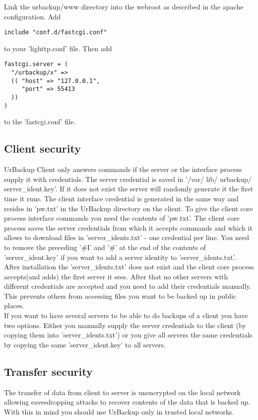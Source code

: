 \documentclass[a4paper,10pt]{article} \usepackage[breaklinks=true]{hyperref}
\begin{document}
Link the urbackup/www directory into the webroot as described in the apache configuration.
Add
\begin{verbatim}
include "conf.d/fastcgi.conf"
\end{verbatim}
to your 'lighttp.conf' file. Then add 
\begin{verbatim}
fastcgi.server = (
  "/urbackup/x" =>
  (( "host" => "127.0.0.1",
     "port" => 55413
  ))
)
\end{verbatim}
to the 'fastcgi.conf' file.

\subsection{Client security}

UrBackup Client only answers commands if the server or the interface process supply it with credentials. The server credential is saved in '/var/ lib/ urbackup/ server\_ident.key'. If it does not exist the server will randomly generate it the first time it runs. The client interface credential is generated in the same way and resides in 'pw.txt' in the UrBackup directory on the client. To give the client core process interface commands you need the contents of 'pw.txt'. The client core process saves the server credentials from which it accepts commands and which it allows to download files in 'server\_idents.txt' - one credential per line. You need to remove the preceding '\#I' and '\#' at the end of the contents of 'server\_ident.key' if you want to add a server identity to 'server\_idents.txt'. After installation the 'server\_idents.txt' does not exist and the client core process accepts(and adds) the first server it sees. After that no other servers with different credentials are accepted and you need to add their credentials manually. This prevents others from accessing files you want to be backed up in public places.\\
If you want to have several servers to be able to do backups of a client you have two options. Either you manually supply the server credentials to the client (by copying them into 'server\_idents.txt') or you give all servers the same credentials by copying the same 'server\_ident.key' to all servers.

\subsection{Transfer security}

The transfer of data from client to server is unencrypted on the local
network allowing eavesdropping attacks to recover contents of the data that is
backed up. With this in mind you should use UrBackup only in trusted local
networks.
\end{document}
